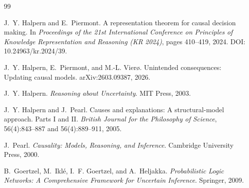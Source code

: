 \documentclass[11pt]{article}
\begin{document}
\begin{thebibliography}{99}

J.~Y. Halpern and E.~Piermont.
\newblock A representation theorem for causal decision making.
\newblock In \emph{Proceedings of the 21st International Conference on Principles of Knowledge Representation and Reasoning (KR 2024)}, pages 410--419, 2024.
\newblock DOI: 10.24963/kr.2024/39.

J.~Y. Halpern, E.~Piermont, and M.-L. Vier\o{}.
\newblock Unintended consequences: Updating causal models.
\newblock arXiv:2603.09387, 2026.

J.~Y. Halpern.
\newblock \emph{Reasoning about Uncertainty}.
\newblock MIT Press, 2003.

J.~Y. Halpern and J.~Pearl.
\newblock Causes and explanations: A structural-model approach. Parts I and II.
\newblock \emph{British Journal for the Philosophy of Science}, 56(4):843--887 and 56(4):889--911, 2005.

J.~Pearl.
\newblock \emph{Causality: Models, Reasoning, and Inference}.
\newblock Cambridge University Press, 2000.

B.~Goertzel, M.~Ikl\'{e}, I.~F. Goertzel, and A.~Heljakka.
\newblock \emph{Probabilistic Logic Networks: A Comprehensive Framework for Uncertain Inference}.
\newblock Springer, 2009.

\end{thebibliography}
\end{document}
